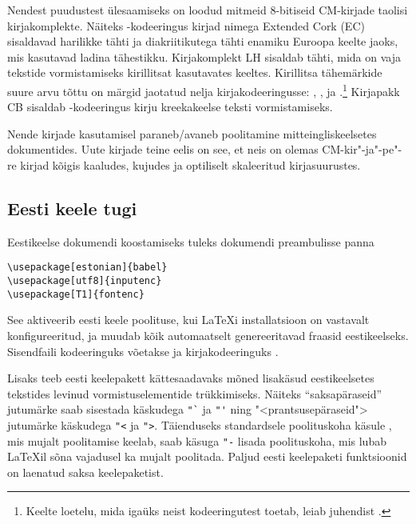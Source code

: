 Nendest puudustest ülesaamiseks on loodud mitmeid 8-bitiseid
CM-kir\-ja\-de taolisi kirjakomplekte. Näiteks
-kodeeringus kirjad nimega Extended
Cork (EC) sisaldavad harilikke tähti ja diakriitikutega tähti enamiku
Euroopa keelte jaoks, mis kasutavad ladina tähestikku. Kirjakomplekt
LH
sisaldab tähti, mida on vaja tekstide vormistamiseks
kirillitsat kasutavates keeltes. Kirillitsa
tähemärkide suure arvu tõttu on märgid jaotatud nelja
kirjakodeeringusse: , ,  ja
.\footnote{Keelte loetelu, mida igaüks neist kodeeringutest
toetab, leiab juhendist \cite{cyrguide}.} Kirjapakk
CB sisaldab
-kodeeringus kirju kreekakeelse teksti
vormistamiseks.

Nende kirjade kasutamisel paraneb/avaneb poolitamine
mitteingliskeelsetes dokumentides. Uute kirjade teine eelis on see, et
neis on olemas CM-kir"-ja"-pe"-re kirjad kõigis
kaaludes, kujudes ja optiliselt skaleeritud kirjasuurustes.

\subsection{Eesti keele tugi}

Eestikeelse dokumendi koostamiseks tuleks dokumendi
preambulisse panna
\begin{lscommand}
\verb|\usepackage[estonian]{babel}|\\
\verb|\usepackage[utf8]{inputenc}|\\
\verb|\usepackage[T1]{fontenc}|
\end{lscommand}
See aktiveerib eesti keele poolituse, kui \LaTeX i installatsioon on
vastavalt konfigureeritud, ja muudab kõik automaatselt genereeritavad
fraasid eestikeelseks. Sisendfaili kodeeringuks võetakse  ja
kirjakodeeringuks .

Lisaks teeb eesti keelepakett kättesaadavaks mõned lisakäsud
eestikeelsetes tekstides levinud vormistuselementide trükkimiseks.
Näiteks "`saksapäraseid"' jutumärke saab sisestada käskudega
\verb|"`| ja
\verb|"'| ning "<prantsusepäraseid">
jutumärke käskudega \verb|"<| ja
\verb|">|. Täienduseks standardsele
poolituskoha käsule \ci{-}, mis mujalt poolitamise keelab, saab
käsuga \verb|"-| lisada poolituskoha,
mis lubab \LaTeX il sõna vajadusel ka mujalt poolitada. Paljud eesti
keelepaketi funktsioonid on laenatud saksa keelepaketist.

